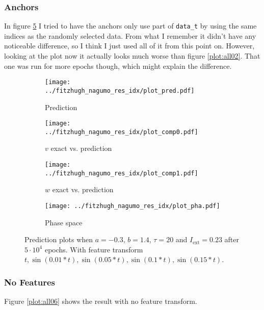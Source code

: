 \documentclass[a4paper]{article}
\begin{document}
\subsubsection{Anchors}

In figure \ref{plot:all05} I tried to have the anchors only use part of \lstinline|data_t| by using the same indices as the randomly selected data. From what I remember it didn't have any noticeable difference, so I think I just used all of it from this point on. However, looking at the plot now it actually looks much worse than figure \ref{plot:all02}. That one was run for more epochs though, which might explain the difference. 

\begin{figure}[H]
	\centering 
	\begin{subfigure}[b]{0.47\textwidth}
		\centering
		\texttt{[image: ../fitzhugh\_nagumo\_res\_idx/plot\_pred.pdf]}
		\caption{Prediction}
		\label{fig:all05a}
	\end{subfigure}
	\begin{subfigure}[b]{0.47\textwidth}
		\centering
		\texttt{[image: ../fitzhugh\_nagumo\_res\_idx/plot\_comp0.pdf]}
		\caption{$v$ exact vs. prediction}
		\label{fig:all05b}
	\end{subfigure}
	\begin{subfigure}[b]{0.47\textwidth}
		\centering
		\texttt{[image: ../fitzhugh\_nagumo\_res\_idx/plot\_comp1.pdf]}
		\caption{$w$ exact vs. prediction}
		\label{fig:all05c}
	\end{subfigure}
	\begin{subfigure}[b]{0.47\textwidth}
		\centering
		\texttt{[image: ../fitzhugh\_nagumo\_res\_idx/plot\_pha.pdf]}
		\caption{Phase space}
		\label{fig:all05d}
	\end{subfigure}
	\caption{Prediction plots when $a=-0.3$, $b=1.4$, $\tau=20$ and $ I_{\text{ext}}=0.23$ after $5\cdot10^4$ epochs. With feature transform $t, \sin(0.01 * t), \sin(0.05 * t), \sin(0.1 * t), \sin(0.15 * t)$.}
	\label{plot:all05}
\end{figure} 	



\subsubsection{No Features}

Figure \ref{plot:all06} shows the result with no feature transform. 
\end{document}
